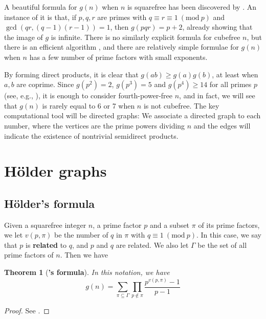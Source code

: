 \documentclass{article}
\newcommand{\Mod}[1]{\ (\mathrm{mod} \ #1)}
\theoremstyle{plain}
\newtheorem{thm}{Theorem}[section]
\theoremstyle{definition}
\begin{document}
A beautiful formula for $g(n)$ when $n$ is squarefree has been discovered by  {\cite[Thm.~5.1]{gnumoas}}. An instance of it is that, if $p, q, r$ are primes with $q \equiv r \equiv 1 \Mod{p}$ and $\gcd(qr, (q-1)(r-1)) = 1$, then $g(pqr) = p + 2$, already showing that the image of $g$ is infinite. There is no similarly explicit formula for cubefree $n$, but there is an efficient algorithm {\cite{cubefree}}, and there are relatively simple formulae for $g(n)$ when $n$ has a few number of prime factors with small exponents.

By forming direct products, it is clear that $g(ab) \ge g(a)g(b)$, at least when $a, b$ are coprime. Since \mbox{$g(p^2) = 2$,} $g(p^3) = 5$ and $g(p^4) \ge 14$ for all primes $p$ (see, e.g., \cite[Thm.~3.1]{gnumoas}), it is enough to consider fourth-power-free $n$, and in fact, we will see that $g(n)$ is rarely equal to 6 or 7 when $n$ is not cubefree.  The key computational tool will be directed graphs: We associate a directed graph to each number, where the vertices are the prime powers dividing $n$ and the edges will indicate the existence of nontrivial semidirect products.

\section{Hölder graphs}
\subsection{Hölder's formula}
Given a squarefree integer $n$, a prime factor $p$ and a subset $\pi$ of its prime factors, we let $v(p, \pi)$ be the number of $q$ in $\pi$ with $q \equiv 1 \Mod{p}$. In this case, we say that $p$ is \textbf{related} to $q$, and $p$ and $q$ are related. We also let $\Gamma$ be the set of all prime factors of $n$. Then we have
\begin{thm}[\textbf{'s formula}] In this notation, we have
	\begin{equation*}
		g(n) = \sum_{\pi \subseteq \Gamma} \prod_{p \notin \pi} \frac{p^{v(p, \pi)} - 1}{p - 1}
	\end{equation*}
\end{thm}
\begin{proof} See {\cite[Thm.~5.1]{gnumoas}}. \end{proof}
\end{document}

